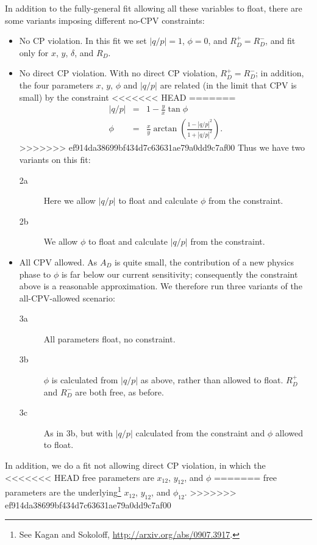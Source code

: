 \documentclass[12pt,pdflatex]{article}
\begin{document}
In addition to the fully-general fit allowing all these variables to float, 
there are some variants imposing different no-CPV constraints:
\begin{itemize}
\item No CP violation. In this fit we set $|q/p|=1$, $\phi=0$, and $R_D^+=R_D^-$, 
and fit only for $x$, $y$, $\delta$, and $R_D$. 
\item No direct CP violation. With no direct CP violation, $R_D^+=R_D^-$;
in addition, the four parameters $x$, $y$, $\phi$ and $|q/p|$ are related 
(in the limit that CPV is small) by the constraint
<<<<<<< HEAD
=======
\begin{eqnarray}
|q/p| &=& 1 - \frac{y}{x}\tan\phi \\
\phi &=& \frac{x}{y}\arctan\left(\frac{1-|q/p|^2}{1+|q/p|^2}\right).
\end{eqnarray}
>>>>>>> ef914da38699bf434d7c63631ae79a0dd9c7af00
Thus we have two variants on this fit:
\begin{description}
\item[2a] Here we allow $|q/p|$ to float and calculate $\phi$
from the constraint. 
\item[2b] We allow $\phi$ to float and calculate $|q/p|$ from the constraint. 
\end{description}
\item All CPV allowed. As $A_D$ is quite
small, the contribution of a new physics phase to $\phi$ is far below
our current sensitivity; consequently the constraint above is a reasonable
approximation. We therefore run three variants of the all-CPV-allowed 
scenario:
\begin{description}
\item[3a] All parameters float, no constraint.
\item[3b] $\phi$ is calculated from $|q/p|$ as above, rather than allowed to float.
$R_D^+$ and $R_D^-$ are both free, as before.
\item[3c] As in 3b, but with $|q/p|$ calculated from the constraint and $\phi$ allowed
to float.
\end{description}
\end{itemize}

In addition, we do a fit not allowing direct CP violation, in which the
<<<<<<< HEAD
free parameters are $x_{12}$, $y_{12}$, and $\phi$
=======
free parameters are the underlying\footnote{See Kagan and Sokoloff, \url{http://arxiv.org/abs/0907.3917}.}
$x_{12}$, $y_{12}$, and $\phi_{12}$. 
>>>>>>> ef914da38699bf434d7c63631ae79a0dd9c7af00
\end{document}
